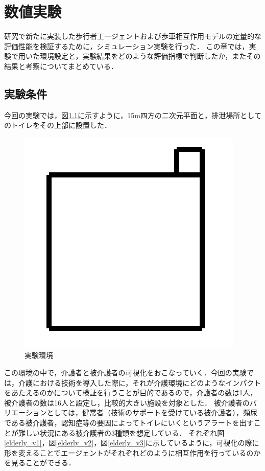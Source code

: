 \chapter{数値実験}

研究で新たに実装した歩行者工一ジェントおよび歩車相互作用モデルの定量的な評価性能を検証するために，シミュレーション実験を行った．
この章では，実験で用いた環境設定と，実験結果をどのような評価指標で判断したか，またその結果と考察についてまとめている．

\section{実験条件}

今回の実験では，図\ref{environment}に示すように，15m四方の二次元平面と，排泄場所としてのトイレをその上部に設置した．

\begin{figure}[htb]
\begin{center}
 \includegraphics[scale=0.6]{figures/environment.png}
 \caption[実験環境]{実験環境 \label{environment}}
\end{center}
\end{figure}

この環境の中で，介護者と被介護者の可視化をおこなっていく．今回の実験では，介護における技術を導入した際に，それが介護環境にどのようなインパクトをあたえるのかについて検証を行うことが目的であるので，介護者の数は1人，被介護者の数は16人と設定し，比較的大きい施設を対象とした．
被介護者のバリエーションとしては，健常者（技術のサポートを受けている被介護者），頻尿である被介護者，認知症等の要因によってトイレにいくというアラートを出すことが難しい状況にある被介護者の3種類を想定している．
それぞれ図\ref{elderly_v1}，図\ref{elderly_v2}，図\ref{elderly_v3}に示しているように，可視化の際に形を変えることでエージェントがそれぞれどのように相互作用を行っているのかを見ることができる．

